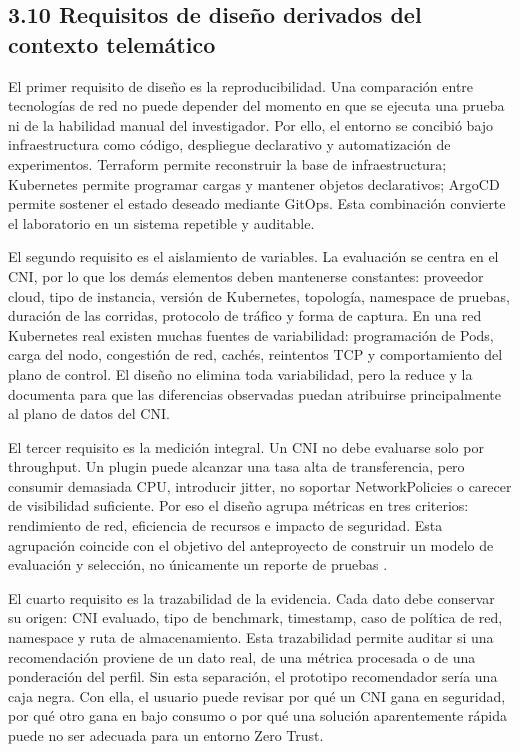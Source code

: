 \subsection{3.10 Requisitos de diseño derivados del contexto telemático}

El primer requisito de diseño es la reproducibilidad. Una comparación entre tecnologías de red no puede depender del momento en que se ejecuta una prueba ni de la habilidad manual del investigador. Por ello, el entorno se concibió bajo infraestructura como código, despliegue declarativo y automatización de experimentos. Terraform permite reconstruir la base de infraestructura; Kubernetes permite programar cargas y mantener objetos declarativos; ArgoCD permite sostener el estado deseado mediante GitOps. Esta combinación convierte el laboratorio en un sistema repetible y auditable.

El segundo requisito es el aislamiento de variables. La evaluación se centra en el CNI, por lo que los demás elementos deben mantenerse constantes: proveedor cloud, tipo de instancia, versión de Kubernetes, topología, namespace de pruebas, duración de las corridas, protocolo de tráfico y forma de captura. En una red Kubernetes real existen muchas fuentes de variabilidad: programación de Pods, carga del nodo, congestión de red, cachés, reintentos TCP y comportamiento del plano de control. El diseño no elimina toda variabilidad, pero la reduce y la documenta para que las diferencias observadas puedan atribuirse principalmente al plano de datos del CNI.

El tercer requisito es la medición integral. Un CNI no debe evaluarse solo por throughput. Un plugin puede alcanzar una tasa alta de transferencia, pero consumir demasiada CPU, introducir jitter, no soportar NetworkPolicies o carecer de visibilidad suficiente. Por eso el diseño agrupa métricas en tres criterios: rendimiento de red, eficiencia de recursos e impacto de seguridad. Esta agrupación coincide con el objetivo del anteproyecto de construir un modelo de evaluación y selección, no únicamente un reporte de pruebas \cite{ref29}.

El cuarto requisito es la trazabilidad de la evidencia. Cada dato debe conservar su origen: CNI evaluado, tipo de benchmark, timestamp, caso de política de red, namespace y ruta de almacenamiento. Esta trazabilidad permite auditar si una recomendación proviene de un dato real, de una métrica procesada o de una ponderación del perfil. Sin esta separación, el prototipo recomendador sería una caja negra. Con ella, el usuario puede revisar por qué un CNI gana en seguridad, por qué otro gana en bajo consumo o por qué una solución aparentemente rápida puede no ser adecuada para un entorno Zero Trust.

